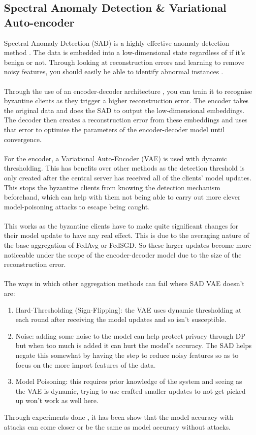 \subsection{Spectral Anomaly Detection \& Variational Auto-encoder}
Spectral Anomaly Detection (SAD) is a highly effective anomaly detection method \cite{sad}.
The data is embedded into a low-dimensional state regardless of if it's benign or not.
Through looking at reconstruction errors and learning to remove noisy features, you should easily be able to identify abnormal instances \cite{variationalAB}.
\\ \\
Through the use of an encoder-decoder architecture \cite{spectral}, you can train it to recognise byzantine clients as they trigger a higher reconstruction error.
The encoder takes the original data and does the SAD to output the low-dimensional embeddings.
The decoder then creates a reconstruction error from these embeddings and uses that error to optimise the parameters of the encoder-decoder model until convergence.
\\ \\
For the encoder, a Variational Auto-Encoder (VAE) is used with dynamic thresholding.
This has benefits over other methods as the detection threshold is only created after the central server has received all of the clients' model updates.
This stops the byzantine clients from knowing the detection mechanism beforehand, which can help with them not being able to carry out more clever model-poisoning attacks to escape being caught.
\\ \\
This works as the byzantine clients have to make quite significant changes for their model update to have any real effect.
This is due to the averaging nature of the base aggregation of FedAvg or FedSGD.
So these larger updates become more noticeable under the scope of the encoder-decoder model due to the size of the reconstruction error.
\\ \\
The ways in which other aggregation methods can fail where SAD VAE doesn't are:
\begin{enumerate}
    \item Hard-Thresholding (Sign-Flipping): the VAE uses dynamic thresholding at each round after receiving the model updates and so isn't susceptible.
    
    \item Noise: adding some noise to the model can help protect privacy through DP but when too much is added it can hurt the model's accuracy. 
    The SAD helps negate this somewhat by having the step to reduce noisy features so as to focus on the more import features of the data.
    
    \item Model Poisoning: this requires prior knowledge of the system and seeing as the VAE is dynamic, trying to use crafted smaller updates to not get picked up won't work as well here.
\end{enumerate}
Through experiments done \cite{spectral}, it has been show that the model accuracy with attacks can come closer or be the same as model accuracy without attacks.

